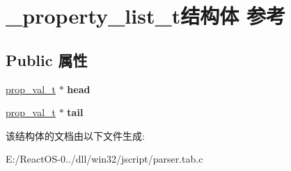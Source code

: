 \hypertarget{struct__property__list__t}{}\section{\+\_\+property\+\_\+list\+\_\+t结构体 参考}
\label{struct__property__list__t}
\subsection*{Public 属性}
\begin{DoxyCompactItemize}
\item 
\mbox{\label{struct__property__list__t_afa45e2788ba4e99dddbc497aa59fb381}} 
\hyperlink{struct__prop__val__t}{prop\+\_\+val\+\_\+t} $\ast$ {\bfseries head}
\item 
\mbox{\label{struct__property__list__t_a8a0668cc9c6c4df19de5523b1d424c7b}} 
\hyperlink{struct__prop__val__t}{prop\+\_\+val\+\_\+t} $\ast$ {\bfseries tail}
\end{DoxyCompactItemize}


该结构体的文档由以下文件生成\+:\begin{DoxyCompactItemize}
\item 
E\+:/\+React\+O\+S-\/0../dll/win32/jscript/parser.\+tab.\+c\end{DoxyCompactItemize}
